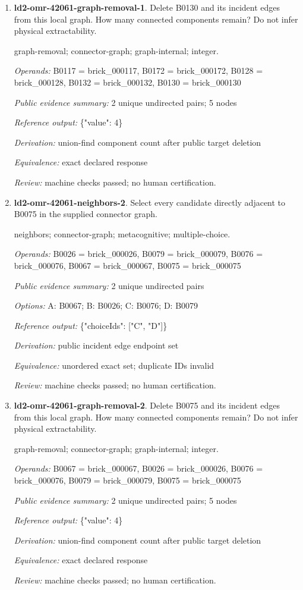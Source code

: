 \begin{enumerate}
\item \textbf{ld2-omr-42061-graph-removal-1}. Delete B0130 and its incident edges from this local graph. How many connected components remain? Do not infer physical extractability.
\par{\small graph-removal; connector-graph; graph-internal; integer.\par\textit{Operands:} B0117 = brick\_000117, B0172 = brick\_000172, B0128 = brick\_000128, B0132 = brick\_000132, B0130 = brick\_000130\par\textit{Public evidence summary:} 2 unique undirected pairs; 5 nodes\par\textit{Reference output:} \{"value": 4\}\par\textit{Derivation:} union-find component count after public target deletion\par\textit{Equivalence:} exact declared response\par\textit{Review:} machine checks passed; no human certification.}
\item \textbf{ld2-omr-42061-neighbors-2}. Select every candidate directly adjacent to B0075 in the supplied connector graph.
\par{\small neighbors; connector-graph; metacognitive; multiple-choice.\par\textit{Operands:} B0026 = brick\_000026, B0079 = brick\_000079, B0076 = brick\_000076, B0067 = brick\_000067, B0075 = brick\_000075\par\textit{Public evidence summary:} 2 unique undirected pairs\par\textit{Options:} A: B0067; B: B0026; C: B0076; D: B0079\par\textit{Reference output:} \{"choiceIds": ["C", "D"]\}\par\textit{Derivation:} public incident edge endpoint set\par\textit{Equivalence:} unordered exact set; duplicate IDs invalid\par\textit{Review:} machine checks passed; no human certification.}
\item \textbf{ld2-omr-42061-graph-removal-2}. Delete B0075 and its incident edges from this local graph. How many connected components remain? Do not infer physical extractability.
\par{\small graph-removal; connector-graph; graph-internal; integer.\par\textit{Operands:} B0067 = brick\_000067, B0026 = brick\_000026, B0076 = brick\_000076, B0079 = brick\_000079, B0075 = brick\_000075\par\textit{Public evidence summary:} 2 unique undirected pairs; 5 nodes\par\textit{Reference output:} \{"value": 4\}\par\textit{Derivation:} union-find component count after public target deletion\par\textit{Equivalence:} exact declared response\par\textit{Review:} machine checks passed; no human certification.}

\end{enumerate}
